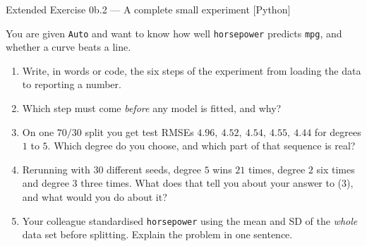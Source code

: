 \documentclass[aspectratio=169,11pt]{beamer}
\begin{document}
\begin{frame}{Extended Exercise 0b.2 --- A complete small experiment [Python]}
  \begin{longexercise}
    You are given \texttt{Auto} and want to know how well \texttt{horsepower}
    predicts \texttt{mpg}, and whether a curve beats a line.
    \begin{enumerate}
      \item Write, in words or code, the six steps of the experiment from
            loading the data to reporting a number.
      \item Which step must come \emph{before} any model is fitted, and why?
      \item On one $70/30$ split you get test RMSEs
            $4.96,\ 4.52,\ 4.54,\ 4.55,\ 4.44$ for degrees $1$ to $5$. Which
            degree do you choose, and which part of that sequence is real?
      \item Rerunning with $30$ different seeds, degree $5$ wins $21$ times,
            degree $2$ six times and degree $3$ three times. What does that
            tell you about your answer to (3), and what would you do about it?
      \item Your colleague standardised \texttt{horsepower} using the mean and
            SD of the \emph{whole} data set before splitting. Explain the
            problem in one sentence.
    \end{enumerate}
  \end{longexercise}
\end{frame}
\end{document}
